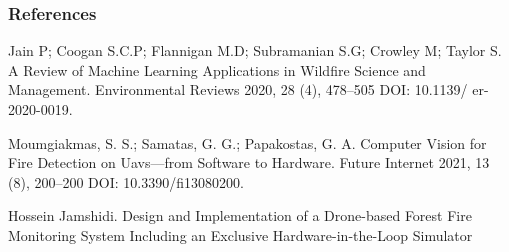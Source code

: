 \begin{frame}
    \frametitle{References}

    \begin{thebibliography}{99}

        Jain P; Coogan S.C.P; Flannigan M.D; Subramanian S.G; Crowley M; Taylor
        S. A Review of Machine Learning Applications in Wildfire Science and
        Management. Environmental Reviews 2020, 28 (4), 478–505 DOI: 10.1139/
        er-2020-0019.

        Moumgiakmas, S. S.; Samatas, G. G.; Papakostas, G. A. Computer Vision
        for Fire Detection on Uavs—from Software to Hardware. Future Internet
        2021, 13 (8), 200–200 DOI: 10.3390/fi13080200.

        Hossein Jamshidi. Design and Implementation of a Drone-based Forest Fire Monitoring
        System Including an Exclusive Hardware-in-the-Loop Simulator


\end{thebibliography}
\end{frame}



